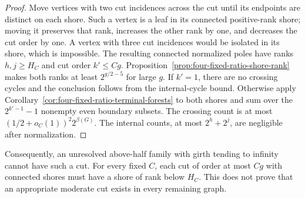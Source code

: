 \begin{proof}
Move vertices with two cut incidences across the cut until its endpoints are distinct on each shore.
Such a vertex is a leaf in its connected positive-rank shore; moving it preserves that rank, increases the other rank by one, and decreases the cut order by one.
A vertex with three cut incidences would be isolated in its shore, which is impossible.
The resulting connected normalized poles have ranks $h,j\ge H_C$ and cut order $k'\le Cg$.
Proposition~\ref{prop:four-fixed-ratio-shore-rank} makes both ranks at least $2^{g/2-5}$ for large $g$.
If $k'=1$, there are no crossing cycles and the conclusion follows from the internal-cycle bound.
Otherwise apply Corollary~\ref{cor:four-fixed-ratio-terminal-forests} to both shores and sum over the $2^{k'-1}-1$ nonempty even boundary subsets.
The crossing count is at most $(1/2+o_C(1))^2 2^{\beta(G)}$.
The internal counts, at most $2^h+2^j$, are negligible after normalization.
\end{proof}

Consequently, an unresolved above-half family with girth tending to infinity cannot have such a cut.
For every fixed $C$, each cut of order at most $Cg$ with connected shores must have a shore of rank below $H_C$.
This does not prove that an appropriate moderate cut exists in every remaining graph.
